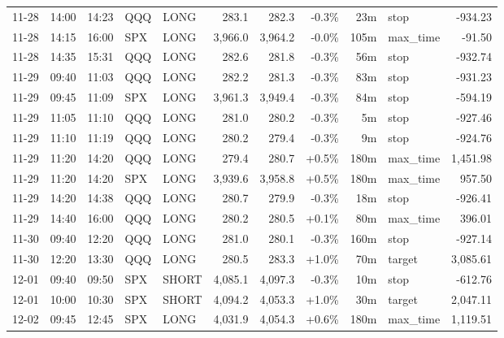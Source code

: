 \documentclass[11pt,a4paper,twoside]{article}
\begin{document}
\begin{center}
\begin{longtable}{>{\color{txtmain}}l l l l l r r r r >{\color{txtmain}}l r}
11-28 & 14:00 & 14:23 & QQQ & LONG & 283.1 & 282.3 & \textcolor{lossred}{-0.3\%} & 23m & stop & \textcolor{lossred}{-934.23} \\
11-28 & 14:15 & 16:00 & SPX & LONG & 3,966.0 & 3,964.2 & \textcolor{lossred}{-0.0\%} & 105m & max\_time & \textcolor{lossred}{-91.50} \\
11-28 & 14:35 & 15:31 & QQQ & LONG & 282.6 & 281.8 & \textcolor{lossred}{-0.3\%} & 56m & stop & \textcolor{lossred}{-932.74} \\
11-29 & 09:40 & 11:03 & QQQ & LONG & 282.2 & 281.3 & \textcolor{lossred}{-0.3\%} & 83m & stop & \textcolor{lossred}{-931.23} \\
11-29 & 09:45 & 11:09 & SPX & LONG & 3,961.3 & 3,949.4 & \textcolor{lossred}{-0.3\%} & 84m & stop & \textcolor{lossred}{-594.19} \\
11-29 & 11:05 & 11:10 & QQQ & LONG & 281.0 & 280.2 & \textcolor{lossred}{-0.3\%} & 5m & stop & \textcolor{lossred}{-927.46} \\
11-29 & 11:10 & 11:19 & QQQ & LONG & 280.2 & 279.4 & \textcolor{lossred}{-0.3\%} & 9m & stop & \textcolor{lossred}{-924.76} \\
11-29 & 11:20 & 14:20 & QQQ & LONG & 279.4 & 280.7 & \textcolor{wingreen}{+0.5\%} & 180m & max\_time & \textcolor{wingreen}{1,451.98} \\
11-29 & 11:20 & 14:20 & SPX & LONG & 3,939.6 & 3,958.8 & \textcolor{wingreen}{+0.5\%} & 180m & max\_time & \textcolor{wingreen}{957.50} \\
11-29 & 14:20 & 14:38 & QQQ & LONG & 280.7 & 279.9 & \textcolor{lossred}{-0.3\%} & 18m & stop & \textcolor{lossred}{-926.41} \\
11-29 & 14:40 & 16:00 & QQQ & LONG & 280.2 & 280.5 & \textcolor{wingreen}{+0.1\%} & 80m & max\_time & \textcolor{wingreen}{396.01} \\
11-30 & 09:40 & 12:20 & QQQ & LONG & 281.0 & 280.1 & \textcolor{lossred}{-0.3\%} & 160m & stop & \textcolor{lossred}{-927.14} \\
11-30 & 12:20 & 13:30 & QQQ & LONG & 280.5 & 283.3 & \textcolor{wingreen}{+1.0\%} & 70m & target & \textcolor{wingreen}{3,085.61} \\
12-01 & 09:40 & 09:50 & SPX & SHORT & 4,085.1 & 4,097.3 & \textcolor{lossred}{-0.3\%} & 10m & stop & \textcolor{lossred}{-612.76} \\
12-01 & 10:00 & 10:30 & SPX & SHORT & 4,094.2 & 4,053.3 & \textcolor{wingreen}{+1.0\%} & 30m & target & \textcolor{wingreen}{2,047.11} \\
12-02 & 09:45 & 12:45 & SPX & LONG & 4,031.9 & 4,054.3 & \textcolor{wingreen}{+0.6\%} & 180m & max\_time & \textcolor{wingreen}{1,119.51} \\

\end{longtable}
\end{center}
\end{document}
